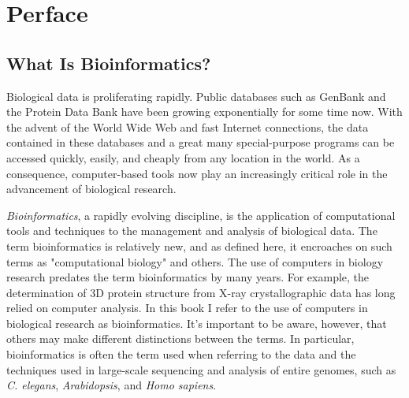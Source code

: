 \setcounter{page}{2}
\chapter*{Perface}

\section*{What Is Bioinformatics?}
Biological data is proliferating rapidly. Public databases such as GenBank and the Protein Data Bank have been growing exponentially for some time now. With the advent of the World Wide Web and fast Internet connections, the data contained in these databases and a great many special-purpose programs can be accessed quickly, easily, and cheaply from any location in the world. As a consequence, computer-based tools now play an increasingly critical role in the advancement of biological research.

\textit{Bioinformatics}, a rapidly evolving discipline, is the application of computational tools and techniques to the management and analysis of biological data. The term bioinformatics is relatively new, and as defined here, it encroaches on such terms as "computational biology" and others. The use of computers in biology research predates the term bioinformatics by many years. For example, the determination of 3D protein structure from X-ray crystallographic data has long relied on computer analysis. In this book I refer to the use of computers in biological research as bioinformatics. It's important to be aware, however, that others may make different distinctions between the terms.  In particular, bioinformatics is often the term used when referring to the data and the techniques used in large-scale sequencing and analysis of entire genomes, such as \textit{C. elegans}, \textit{Arabidopsis}, and \textit{Homo sapiens}.

